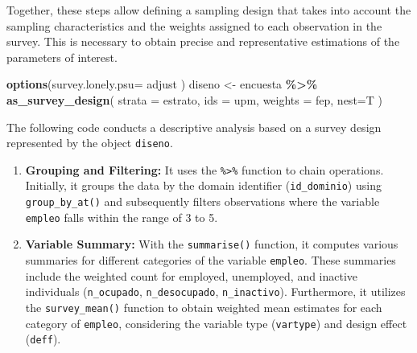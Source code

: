 \documentclass[
  12pt,
]{book}
\newenvironment{Shaded}{\begin{snugshade}}{\end{snugshade}}
\newcommand{\AttributeTok}[1]{\textcolor[rgb]{0.13,0.29,0.53}{#1}}
\newcommand{\FunctionTok}[1]{\textcolor[rgb]{0.13,0.29,0.53}{\textbf{#1}}}
\newcommand{\NormalTok}[1]{#1}
\newcommand{\OtherTok}[1]{\textcolor[rgb]{0.56,0.35,0.01}{#1}}
\newcommand{\SpecialCharTok}[1]{\textcolor[rgb]{0.81,0.36,0.00}{\textbf{#1}}}
\newcommand{\StringTok}[1]{\textcolor[rgb]{0.31,0.60,0.02}{#1}}
\begin{document}
Together, these steps allow defining a sampling design that takes into account the sampling characteristics and the weights assigned to each observation in the survey. This is necessary to obtain precise and representative estimations of the parameters of interest.

\begin{Shaded}
\begin{Highlighting}[]
\FunctionTok{options}\NormalTok{(}\AttributeTok{survey.lonely.psu=} \StringTok{\textquotesingle{}adjust\textquotesingle{}}\NormalTok{ )}
\NormalTok{diseno }\OtherTok{\textless{}{-}}\NormalTok{ encuesta }\SpecialCharTok{\%\textgreater{}\%}
  \FunctionTok{as\_survey\_design}\NormalTok{(}
    \AttributeTok{strata =}\NormalTok{ estrato,}
    \AttributeTok{ids =}\NormalTok{ upm,}
    \AttributeTok{weights =}\NormalTok{ fep,}
    \AttributeTok{nest=}\NormalTok{T}
\NormalTok{  )}
\end{Highlighting}
\end{Shaded}

The following code conducts a descriptive analysis based on a survey design represented by the object \texttt{diseno}.

\begin{enumerate}
\def\labelenumi{\arabic{enumi}.}
\item
  \textbf{Grouping and Filtering:} It uses the \texttt{\%\textgreater{}\%} function to chain operations. Initially, it groups the data by the domain identifier (\texttt{id\_dominio}) using \texttt{group\_by\_at()} and subsequently filters observations where the variable \texttt{empleo} falls within the range of 3 to 5.
\item
  \textbf{Variable Summary:} With the \texttt{summarise()} function, it computes various summaries for different categories of the variable \texttt{empleo}. These summaries include the weighted count for employed, unemployed, and inactive individuals (\texttt{n\_ocupado}, \texttt{n\_desocupado}, \texttt{n\_inactivo}). Furthermore, it utilizes the \texttt{survey\_mean()} function to obtain weighted mean estimates for each category of \texttt{empleo}, considering the variable type (\texttt{vartype}) and design effect (\texttt{deff}).
\end{enumerate}
\end{document}
